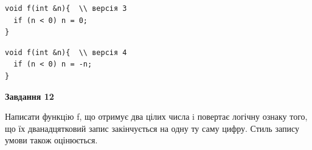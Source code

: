 \documentclass[12pt, ukrainian]{article}
\begin{document}
{\begin {large}
\begin{minipage}[t]{11.0cm}
\vspace{-8mm}\begin{verbatim}
void f(int &n){  \\ версія 3
  if (n < 0) n = 0;
}
\end{verbatim}

\vspace{-8mm}\begin{verbatim}
void f(int &n){  \\ версія 4
  if (n < 0) n = -n;
}
\end{verbatim}



\begin{center}
\textbf{Завдання 12}
\end{center}

Написати функцiю f, що отримує два цілих числа i повертає логічну ознаку того, що їх дванадцятковий запис закінчується на одну ту саму цифру. Стиль запису умови також оцінюється.\par

\end{minipage}

\end {large}}
\newpage
\end{document}

